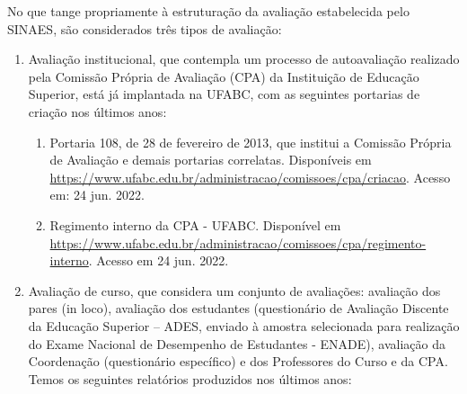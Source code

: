 No que tange propriamente à estruturação da avaliação estabelecida pelo SINAES,
são considerados três tipos de avaliação:
\begin{enumerate}
    \item Avaliação institucional, que contempla um processo de autoavaliação
    realizado pela Comissão Própria de Avaliação (CPA) da Instituição de
    Educação Superior, está já implantada na UFABC, com as seguintes portarias
    de criação nos últimos anos:
    \begin{enumerate}
        \item Portaria 108, de 28 de fevereiro de 2013, que institui a Comissão
        Própria de Avaliação e demais portarias correlatas. Disponíveis em
        \url{https://www.ufabc.edu.br/administracao/comissoes/cpa/criacao}.
        Acesso em: 24 jun. 2022.
        \item Regimento interno da CPA - UFABC. Disponível em
        \url{https://www.ufabc.edu.br/administracao/comissoes/cpa/regimento-interno}.
        Acesso em 24 jun. 2022.
    \end{enumerate}
    
    \item Avaliação de curso, que considera um conjunto de avaliações:
    avaliação dos pares (in loco), avaliação dos estudantes (questionário de
    Avaliação Discente da Educação Superior – ADES, enviado à amostra
    selecionada para realização do Exame Nacional de Desempenho de Estudantes -
    ENADE), avaliação da Coordenação (questionário específico) e dos
    Professores do Curso e da CPA. Temos os seguintes relatórios produzidos nos
    últimos anos:
    

\end{enumerate}
